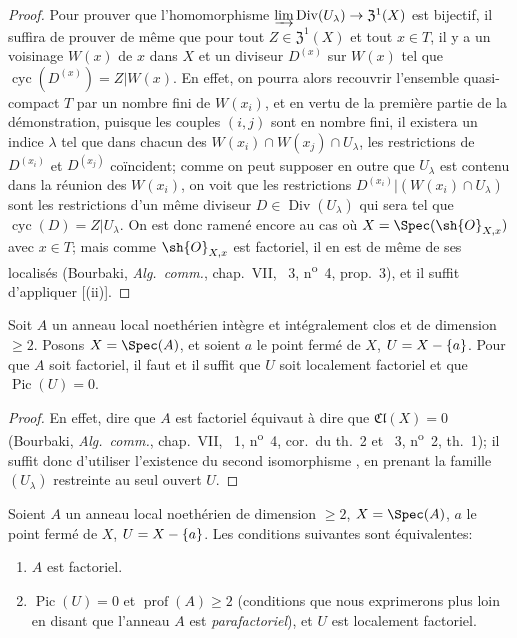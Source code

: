 \begin{proof}
Pour prouver que l'homomorphisme $\varinjlim\operatorname{Div}(U_\lambda)\to\mathfrak{Z}^1(X)$ est bijectif, il suffira de prouver de même que pour tout $Z\in\mathfrak{Z}^1(X)$ et tout $x\in T$, il y a un voisinage $W(x)$
de $x$ dans $X$ et un diviseur $D^{(x)}$ sur $W(x)$ tel que $\operatorname{cyc}(D^{(x)})=Z|W(x)$.
En effet, on pourra alors recouvrir l'ensemble quasi-compact $T$ par un nombre fini de $W(x_i)$, et en vertu de la première partie de la démonstration, puisque les couples $(i,j)$ sont en nombre fini, il existera un indice $\lambda$ tel que dans chacun des $W(x_i)\cap W(x_j)\cap U_\lambda$, les restrictions de $D^{(x_i)}$ et $D^{(x_j)}$ coïncident;
comme on peut supposer en outre que $U_\lambda$ est contenu dans la réunion des $W(x_i)$, on voit que les restrictions $D^{(x_i)}|(W(x_i)\cap U_\lambda)$ sont les restrictions d'un même diviseur $D\in\operatorname{Div}(U_\lambda)$ qui sera tel que $\operatorname{cyc}(D)=Z|U_\lambda$.
On est donc ramené encore au cas où $X=\Spec(\sh{O}_{X,x})$ avec $x\in T$; mais comme $\sh{O}_{X,x}$ est factoriel, il en est de même de ses localisés (Bourbaki, \emph{Alg.\ comm.}, chap.~VII, \textsection~3, n\textsuperscript{o}~4, prop.~3), et il suffit d'appliquer [(ii)].
\end{proof}

\begin{corollary}[21.6.13]
\label{IV.21.6.13}
Soit $A$ un anneau local noethérien intègre et intégralement clos et de dimension $\geq2$.
Posons $X=\Spec(A)$, et soient $a$ le point fermé de $X$, $U=X-\{a\}$.
Pour que $A$ soit factoriel, il faut et il suffit que $U$ soit localement factoriel et que $\operatorname{Pic}(U)=0$.
\end{corollary}

\begin{proof}
En effet, dire que $A$ est factoriel équivaut à dire que $\mathfrak{Cl}(X)=0$ (Bourbaki, \emph{Alg.\ comm.}, chap.~VII, \textsection~1, n\textsuperscript{o}~4, cor.\ du th.~2 et \textsection~3, n\textsuperscript{o}~2, th.~1);
il suffit donc d'utiliser l'existence du second isomorphisme , en prenant la famille $(U_\lambda)$ restreinte au seul ouvert $U$.
\end{proof}

\begin{corollary}[21.6.14]
\label{IV.21.6.14}
Soient $A$ un anneau local noethérien de dimension $\geq2$, $X=\Spec(A)$, $a$ le point fermé de $X$, $U=X-\{a\}$.
Les conditions suivantes sont équivalentes:
\begin{enumerate}[label=\emph{\alph*)}]
  \item $A$ est factoriel.
  \item $\operatorname{Pic}(U)=0$ et $\operatorname{prof}(A)\geq2$ \textup{(conditions que nous exprimerons plus loin  en disant que l'anneau $A$ est \emph{parafactoriel})}, et $U$ est localement factoriel.
\end{enumerate}
\end{corollary}

